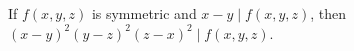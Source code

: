 If $f(x, y, z)$ is symmetric and $x - y \mid f(x, y, z)$, then $(x - y)^2(y - z)^2(z - x)^2 \mid f(x, y, z)$.
